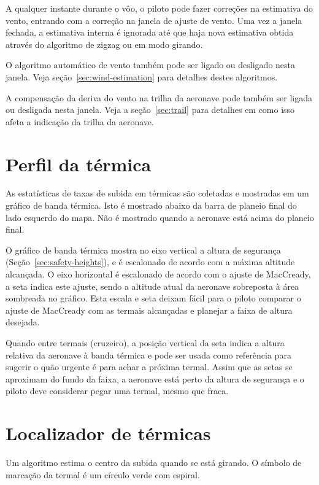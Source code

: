 A qualquer instante durante o vôo, o piloto pode fazer correções na estimativa do vento, entrando com a correção na janela de ajuste de vento.  Uma vez a janela fechada, a estimativa interna é ignorada até que haja nova estimativa obtida através do algoritmo de zigzag ou em modo girando.

O algoritmo automático de vento também pode ser ligado ou desligado nesta janela.  Veja seção~\ref{sec:wind-estimation}
para detalhes destes algoritmos.

A compensação da deriva do vento na trilha da aeronave pode também ser ligada ou desligada nesta janela.  Veja a seção~\ref{sec:trail} para detalhes em como isso afeta a indicação da trilha da aeronave.  

\section{Perfil da térmica}

As estatísticas de taxas de subida em térmicas são coletadas e mostradas em um gráfico de banda térmica.  Isto é mostrado abaixo da barra de planeio final do lado esquerdo do mapa.  Não é mostrado quando a aeronave está acima do planeio final.

\vskip 2cm

O gráfico de banda térmica mostra no eixo vertical a altura de segurança  (Seção~\ref{sec:safety-heights}), e é escalonado de acordo com a máxima altitude alcançada.  O eixo horizontal é escalonado de acordo com o ajuste de MacCready, a seta indica este ajuste, sendo a altitude atual da aeronave sobreposta à área sombreada no gráfico.    Esta escala e seta deixam fácil para o piloto comparar o ajuste de MacCready com as termais alcançadas e planejar a faixa de altura desejada.

Quando entre termais (cruzeiro), a posição vertical da seta indica a altura relativa da aeronave à banda térmica e pode ser usada como referência para sugerir o quão urgente é para achar a próxima termal.  Assim que as setas se aproximam do fundo da faixa, a aeronave está perto da altura de segurança e o piloto deve considerar pegar uma termal, mesmo que fraca.  


\section{Localizador de térmicas}
Um algoritmo estima o centro da subida quando se está girando.  O símbolo de marcação da termal é um círculo verde com espiral.


